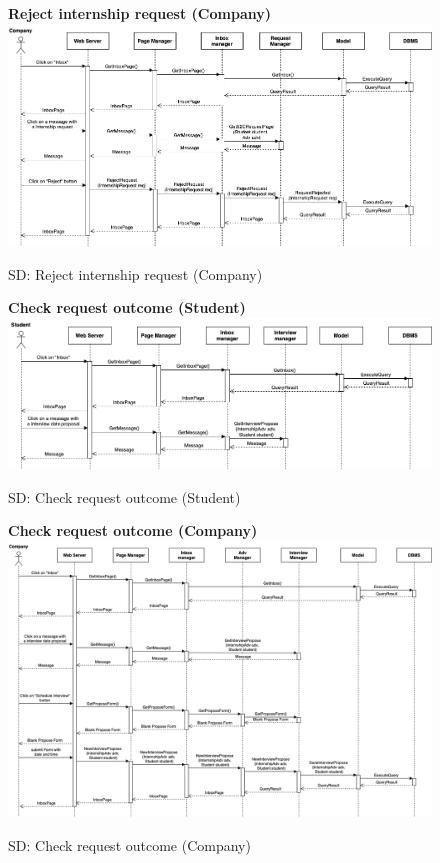 \begin{figure}[H]
\textbf{Reject internship request (Company)}\newline\newline
\includegraphics[width=15cm]{images/architectural design/runtime/DD-UC17.2.drawio.png}
    \caption{SD: Reject internship request (Company)}
\end{figure}

\begin{figure}[H]
\textbf{Check request outcome (Student)}\newline\newline
\includegraphics[width=15cm]{images/architectural design/runtime/DD-UC18.drawio.png}
    \caption{SD: Check request outcome (Student)}
\end{figure}

\begin{figure}[H]
\textbf{Check request outcome (Company)}\newline\newline
\includegraphics[width=15cm]{images/architectural design/runtime/DD-UC19.drawio.png}
    \caption{SD: Check request outcome (Company)}
\end{figure}

